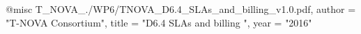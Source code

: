 @misc{ T_NOVA_./WP6/TNOVA_D6.4_SLAs_and_billing_v1.0.pdf,
       author = "T-NOVA Consortium",
       title = "D6.4 SLAs and billing ",
       year = "2016" }
